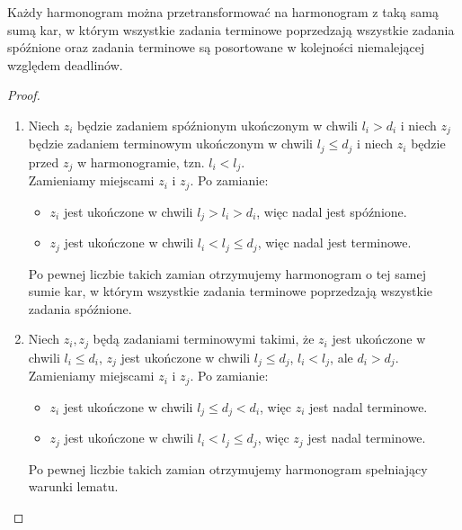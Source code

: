 \begin{lemma}
	Każdy harmonogram można przetransformować na harmonogram z taką samą sumą kar, w którym wszystkie zadania terminowe poprzedzają wszystkie zadania spóźnione oraz zadania terminowe są posortowane w kolejności niemalejącej względem deadlinów.
\end{lemma}
\begin{proof}~
	\begin{enumerate}
		\item Niech $z_i$ będzie zadaniem spóźnionym ukończonym w chwili $l_i > d_i$ i niech $z_j$ będzie zadaniem terminowym ukończonym w chwili $l_j \leq d_j$ i niech $z_i$ będzie przed $z_j$ w harmonogramie, tzn. $l_i < l_j$.\\
		      Zamieniamy miejscami $z_i$ i $z_j$. Po zamianie:
		      \begin{itemize}[nosep]
			      \item $z_i$ jest ukończone w chwili $l_j > l_i > d_i$, więc nadal jest spóźnione.
			      \item $z_j$ jest ukończone w chwili $l_i < l_j \leq d_j$, więc nadal jest terminowe.
		      \end{itemize}
		      Po pewnej liczbie takich zamian otrzymujemy harmonogram o tej samej sumie kar, w którym wszystkie zadania terminowe poprzedzają wszystkie zadania spóźnione.

		\item Niech $z_i, z_j$ będą zadaniami terminowymi takimi, że $z_i$ jest ukończone w chwili $l_i \leq d_i$, $z_j$ jest ukończone w chwili $l_j \leq d_j$, $l_i < l_j$, ale $d_i > d_j$.\\
		      Zamieniamy miejscami $z_i$ i $z_j$. Po zamianie:
		      \begin{itemize}[nosep]
			      \item $z_i$ jest ukończone w chwili $l_j \leq d_j < d_i$, więc $z_i$ jest nadal terminowe.
			      \item $z_j$ jest ukończone w chwili $l_i < l_j \leq d_j$, więc $z_j$ jest nadal terminowe.
		      \end{itemize}
		      Po pewnej liczbie takich zamian otrzymujemy harmonogram spełniający warunki lematu.
	\end{enumerate}
\end{proof}

